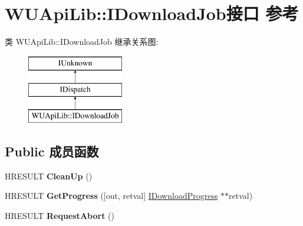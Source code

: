 \hypertarget{interface_w_u_api_lib_1_1_i_download_job}{}\section{W\+U\+Api\+Lib\+:\+:I\+Download\+Job接口 参考}
\label{interface_w_u_api_lib_1_1_i_download_job}
类 W\+U\+Api\+Lib\+:\+:I\+Download\+Job 继承关系图\+:\begin{figure}[H]
\begin{center}
\leavevmode
\includegraphics[height=3.000000cm]{interface_w_u_api_lib_1_1_i_download_job}
\end{center}
\end{figure}
\subsection*{Public 成员函数}
\begin{DoxyCompactItemize}
\item 
\mbox{\label{interface_w_u_api_lib_1_1_i_download_job_a4bfcd043841e719995d93bae4f441024}} 
H\+R\+E\+S\+U\+LT {\bfseries Clean\+Up} ()
\item 
\mbox{\label{interface_w_u_api_lib_1_1_i_download_job_ad54ed56c41849ff2feab8cb5f0fd323e}} 
H\+R\+E\+S\+U\+LT {\bfseries Get\+Progress} (\mbox{[}out, retval\mbox{]} \hyperlink{interface_w_u_api_lib_1_1_i_download_progress}{I\+Download\+Progress} $\ast$$\ast$retval)
\item 
\mbox{\label{interface_w_u_api_lib_1_1_i_download_job_a1edea94a125b2d4932139b30e477b9e1}} 
H\+R\+E\+S\+U\+LT {\bfseries Request\+Abort} ()
\end{DoxyCompactItemize}
